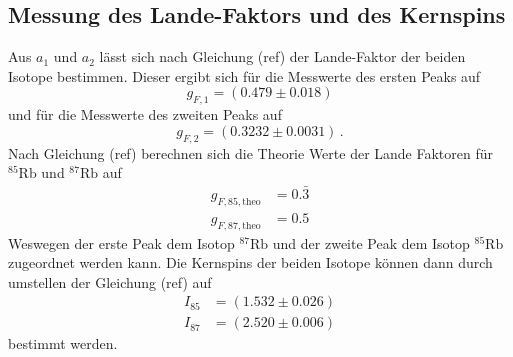 \subsection{Messung des Lande-Faktors und des Kernspins}
Aus $a_1$ und $a_2$ lässt sich nach Gleichung (ref) der Lande-Faktor der beiden Isotope bestimmen.
Dieser ergibt sich für die Messwerte des ersten Peaks auf 
\begin{equation}
  g_{F, 1} = \left(0.479 \pm 0.018 \right)
\end{equation} 
und für die Messwerte des zweiten Peaks auf
\begin{equation}
  g_{F, 2} = \left(0.3232 \pm 0.0031 \right) \, .
\end{equation}
Nach Gleichung (ref) berechnen sich die Theorie Werte der Lande Faktoren für ${}^{85}\text{Rb}$ und ${}^{87}\text{Rb}$ auf 
\begin{align*}
  g_{F, 85, \text{theo}} &= 0.\bar{3} \\
  g_{F, 87, \text{theo}} &= 0.5
\end{align*}
Weswegen der erste Peak dem Isotop ${}^{87}\text{Rb}$ und der zweite Peak dem Isotop ${}^{85}\text{Rb}$ zugeordnet werden kann.
Die Kernspins der beiden Isotope können dann durch umstellen der Gleichung (ref) auf 
\begin{align*}
  I_{85} &= \left(1.532 \pm 0.026\right) \\
  I_{87} &= \left(2.520 \pm 0.006\right)
\end{align*}
bestimmt werden.
